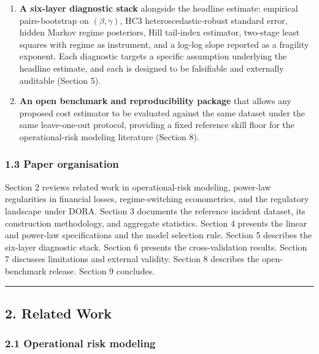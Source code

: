 \documentclass[
]{article}
\begin{document}
\begin{enumerate}
  \(57\%\) (Section 6).
\item
  \textbf{A six-layer diagnostic stack} alongside the headline estimate:
  empirical pairs-bootstrap on \((\beta, \gamma)\), HC3
  heteroscedastic-robust standard error, hidden Markov regime
  posteriors, Hill tail-index estimator, two-stage least squares with
  regime as instrument, and a log-log slope reported as a fragility
  exponent. Each diagnostic targets a specific assumption underlying the
  headline estimate, and each is designed to be falsifiable and
  externally auditable (Section 5).
\item
  \textbf{An open benchmark and reproducibility package} that allows any
  proposed cost estimator to be evaluated against the same dataset under
  the same leave-one-out protocol, providing a fixed reference skill
  floor for the operational-risk modeling literature (Section 8).
\end{enumerate}

\subsubsection{1.3 Paper organisation}\label{paper-organisation}

Section 2 reviews related work in operational-risk modeling, power-law
regularities in financial losses, regime-switching econometrics, and the
regulatory landscape under DORA. Section 3 documents the reference
incident dataset, its construction methodology, and aggregate
statistics. Section 4 presents the linear and power-law specifications
and the model selection rule. Section 5 describes the six-layer
diagnostic stack. Section 6 presents the cross-validation results.
Section 7 discusses limitations and external validity. Section 8
describes the open-benchmark release. Section 9 concludes.

\begin{center}\rule{0.5\linewidth}{0.5pt}\end{center}

\subsection{2. Related Work}\label{related-work}

\subsubsection{2.1 Operational risk
modeling}\label{operational-risk-modeling}
\end{document}
